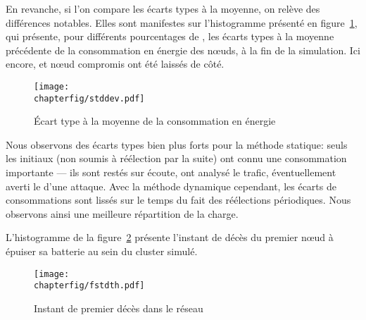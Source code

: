 En revanche, si l'on compare les écarts types à la moyenne, on relève des différences notables.
Elles sont manifestes sur l'histogramme présenté en figure~\ref{sa:fig:conso-ecart-type}, qui présente, pour différents pourcentages de \cns, les écarts types à la moyenne précédente de la consommation en énergie des nœuds, à la fin de la simulation.
Ici encore, \ch et nœud compromis ont été laissés de côté.
\begin{figure}[ht]
    \centering
    \texttt{[image: \\chapterfig/stddev.pdf]}
    \caption{Écart type à la moyenne de la consommation en énergie}\label{sa:fig:conso-ecart-type}
\end{figure}
Nous observons des écarts types bien plus forts pour la méthode statique: seuls les \cns initiaux (non soumis à réélection par la suite) ont connu une consommation importante --- ils sont restés sur écoute, ont analysé le trafic, éventuellement averti le \ch d'une attaque.
Avec la méthode dynamique cependant, les écarts de consommations sont lissés sur le temps du fait des réélections périodiques.
Nous observons ainsi une meilleure répartition de la charge.

L'histogramme de la figure~\ref{sa:fig:premier-deces} présente l'instant de décès du premier nœud à épuiser sa batterie au sein du cluster simulé.
\begin{figure}[ht]
    \centering
    \texttt{[image: \\chapterfig/fstdth.pdf]}
    \caption{Instant de premier décès dans le réseau}\label{sa:fig:premier-deces}
\end{figure}

